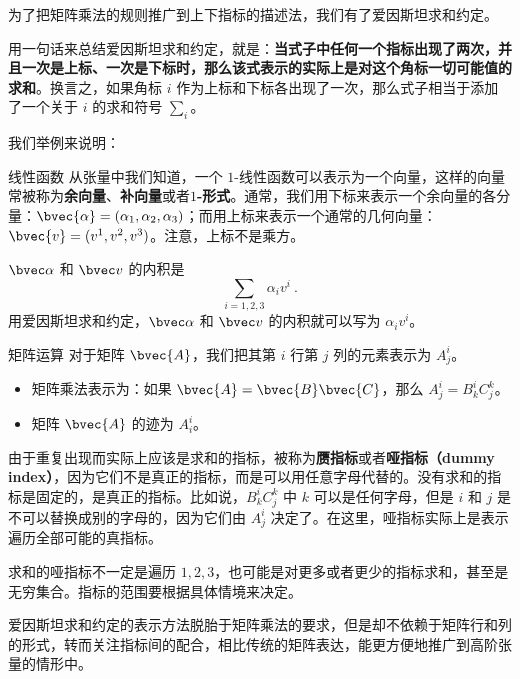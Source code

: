 为了把矩阵乘法的规则推广到上下指标的描述法，我们有了爱因斯坦求和约定。

用一句话来总结爱因斯坦求和约定，就是：\textbf{当式子中任何一个指标出现了两次，并且一次是上标、一次是下标时，那么该式表示的实际上是对这个角标一切可能值的求和}。换言之，如果角标 $i$ 作为上标和下标各出现了一次，那么式子相当于添加了一个关于 $i$ 的求和符号 $\sum_i$。

我们举例来说明：

\begin{example}{线性函数}
从张量中我们知道，一个 $1$-线性函数可以表示为一个向量，这样的向量常被称为\textbf{余向量}、\textbf{补向量}或者\textbf{$1$-形式}。通常，我们用下标来表示一个余向量的各分量：$\bvec{\alpha}=(\alpha_1, \alpha_2, \alpha_3)$；而用上标来表示一个通常的几何向量：$\bvec{v}=(v^1, v^2, v^3)$。注意，上标不是乘方。

$\bvec\alpha$ 和 $\bvec v$ 的内积是$$\sum\limits_{i=1, 2, 3}\alpha_i v^i~.$$
用爱因斯坦求和约定，$\bvec\alpha$ 和 $\bvec v$ 的内积就可以写为 $\alpha_i v^i$。
\end{example}

\begin{example}{矩阵运算}
对于矩阵 $\bvec{A}$，我们把其第 $i$ 行第 $j$ 列的元素表示为 $A^i_j$。
\begin{itemize}
\item 矩阵乘法表示为：如果 $\bvec{A}=\bvec{B}\bvec{C}$，那么 $A^i_j=B^i_k C^k_j$。
\item 矩阵 $\bvec{A}$ 的迹为 $A^i_i$。

\end{itemize}
\end{example}

由于重复出现而实际上应该是求和的指标，被称为\textbf{赝指标}或者\textbf{哑指标（dummy index）}，因为它们不是真正的指标，而是可以用任意字母代替的。没有求和的指标是固定的，是真正的指标。比如说，$B^i_k C^k_j$ 中 $k$ 可以是任何字母，但是 $i$ 和 $j$ 是不可以替换成别的字母的，因为它们由 $A^i_j$ 决定了。在这里，哑指标实际上是表示遍历全部可能的真指标。

求和的哑指标不一定是遍历 $1, 2, 3$，也可能是对更多或者更少的指标求和，甚至是无穷集合。指标的范围要根据具体情境来决定。

爱因斯坦求和约定的表示方法脱胎于矩阵乘法的要求，但是却不依赖于矩阵行和列的形式，转而关注指标间的配合，相比传统的矩阵表达，能更方便地推广到高阶张量的情形中。


